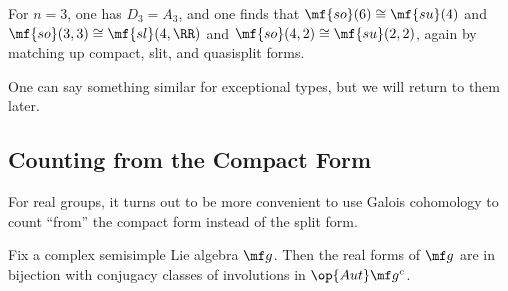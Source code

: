 \documentclass[../notes.tex]{subfiles}
\begin{document}
\begin{example}
	For $n=3$, one has $D_3=A_3$, and one finds that $\mf{so}(6)\cong\mf{su}(4)$ and $\mf{so}(3,3)\cong\mf{sl}(4,\RR)$ and $\mf{so}(4,2)\cong\mf{su}(2,2)$, again by matching up compact, slit, and quasisplit forms.
\end{example}
One can say something similar for exceptional types, but we will return to them later.

\subsection{Counting from the Compact Form}
For real groups, it turns out to be more convenient to use Galois cohomology to count ``from'' the compact form instead of the split form.
\begin{proposition} \label{prop:form-by-compact}
	Fix a complex semisimple Lie algebra $\mf g$. Then the real forms of $\mf g$ are in bijection with conjugacy classes of involutions in $\op{Aut}\mf g^c$.
\end{proposition}
\end{document}
